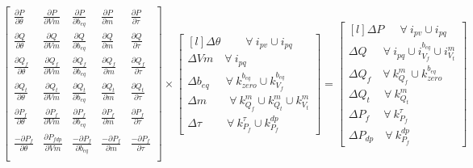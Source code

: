 \documentclass[11pt]{article}
\begin{document}
	\begin{equation}
		\begin{bmatrix}
			\frac{\partial P}{\partial \theta} & \frac{\partial P}{\partial Vm} & \frac{\partial P}{\partial b_{eq}} & \frac{\partial P}{\partial m} & \frac{\partial P}{\partial \tau} \\
			\frac{\partial Q}{\partial \theta} & \frac{\partial Q}{\partial Vm} & \frac{\partial Q}{\partial b_{eq}} & \frac{\partial Q}{\partial m} & \frac{\partial Q}{\partial \tau} \\
			\frac{\partial Q_f}{\partial \theta} & \frac{\partial Q_f}{\partial Vm} & \frac{\partial Q_f}{\partial b_{eq}} & \frac{\partial Q_f}{\partial m} & \frac{\partial Q_f}{\partial \tau} \\
			\frac{\partial Q_t}{\partial \theta} & \frac{\partial Q_t}{\partial Vm} & \frac{\partial Q_t}{\partial b_{eq}} & \frac{\partial Q_t}{\partial m} & \frac{\partial Q_t}{\partial \tau} \\
			\frac{\partial P_f}{\partial \theta} & \frac{\partial P_f}{\partial Vm} & \frac{\partial P_f}{\partial b_{eq}} & \frac{\partial P_f}{\partial m} & \frac{\partial P_f}{\partial \tau} \\
			\frac{-\partial P_f}{\partial \theta} & \frac{\partial P_{fdp}}{\partial Vm} & \frac{-\partial P_{f}}{\partial b_{eq}} & \frac{-\partial P_{f}}{\partial m} & \frac{-\partial P_{f}}{\partial \tau} \\
		\end{bmatrix}	
		\times 
		\begin{bmatrix*}[l]
			\Delta \theta  \quad \quad \ \forall \ i_{pv} \cup i_{pq}  \\
			\Delta Vm  \quad   \forall \ i_{pq}  \\
			\Delta b_{eq}  \quad \ \ \forall  \ k_{zero}^{b_{eq}} \cup k_{V_f}^{b_{eq}}  \\	
			\Delta m  \quad \quad \forall  \ k_{Q_f}^m \cup k_{Q_t}^m \cup k_{V_t}^m  \\
			\Delta \tau  \quad \quad \ \forall \ k_{P_f}^\tau \cup k_{P_f}^{dp}
		\end{bmatrix*}
		= 
		\begin{bmatrix*}[l]
			\Delta P \quad \ \ \forall \ i_{pv} \cup i_{pq} \\
			\Delta Q \quad \ \ \forall \ i_{pq} \cup i_{V_f}^{b_{eq}} \cup i_{V_t}^m  \\
			\Delta Q_f \quad \forall \ k_{Q_f}^m \cup k_{zero}^{b_{eq}} \\
			\Delta Q_t \quad \ \forall \ k_{Q_t}^m  \\
			\Delta P_f \quad \ \forall \ k_{P_f}^\tau  \\
			\Delta P_{dp} \quad \forall \ k_{P_f}^{dp}
		\end{bmatrix*}
	\end{equation}
\end{document}
